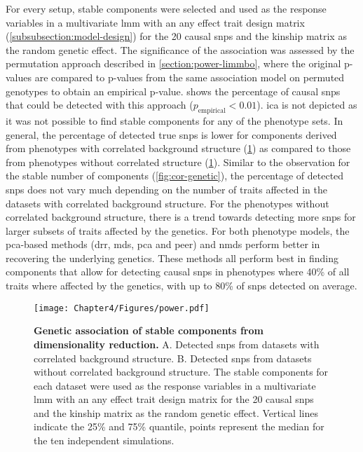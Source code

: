 For every setup, stable components were selected and used as the response variables in a multivariate \gls{lmm} with an any effect trait design matrix (\cref{subsubsection:model-design}) for the \num{20} causal \glspl{snp} and the kinship matrix as the random genetic effect. The significance of the association was assessed by the permutation approach described in \cref{section:power-limmbo}, where the original p-values are compared to p-values from the same association model on permuted genotypes to obtain an empirical p-value.  shows the percentage of causal \glspl{snp} that could be detected with this approach (\(p_\text{empirical} < 0.01\)). \gls{ica} is not depicted as it was not possible to find stable components for any of the phenotype sets.  In general, the percentage of detected true \glspl{snp} is lower for components derived from phenotypes with correlated background structure (\cref{fig:power-dimRed}) as compared to those from phenotypes without correlated structure (\cref{fig:power-dimRed}). Similar to the observation for the stable number of components (\cref{fig:cor-genetic}), the percentage of detected \glspl{snp} does not vary much depending on the number of traits affected in the datasets with correlated background structure. For the phenotypes without correlated background structure, there is a trend towards detecting more \glspl{snp} for larger subsets of traits affected by the genetics. For both phenotype models, the \gls{pca}-based methods (\gls{drr}, \gls{mds}, \gls{pca} and \gls{peer}) and \gls{nmds} perform better in recovering the underlying genetics. These methods all perform best in finding components that allow for detecting causal \glspl{snp} in phenotypes where \num{40}\% of all traits where affected by the genetics, with up to \num{80}\% of \glspl{snp} detected on average. 
%
\begin{figure}[hbtp]
	\centering
	\texttt{[image: Chapter4/Figures/power.pdf]}
	\caption[\textbf{Genetic association of stable components from dimensionality reduction.}]{\textbf{Genetic association of stable components from dimensionality reduction. } A. Detected \glspl{snp} from datasets with correlated background structure. B.  Detected \glspl{snp} from datasets without correlated background structure. The stable components for each dataset were used as the response variables in a multivariate \gls{lmm} with an any effect trait design matrix for the \num{20} causal \glspl{snp} and the kinship matrix as the random genetic effect. Vertical lines indicate the \num{25}\% and \num{75}\% quantile, points represent the median for the ten independent simulations. } 
	 	\label{fig:power-dimRed}
\end{figure}


